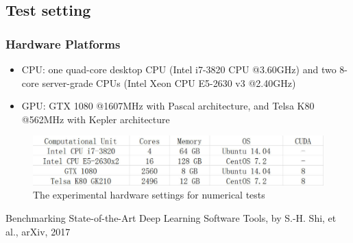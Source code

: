 \begin{frame}
\end{frame}

\subsection{Test setting}

\begin{frame}
	\MyLogo
	\frametitle{Hardware Platforms}  

\smallskip 

\begin{itemize}\setlength\itemsep{0.5em}

\item CPU: one quad-core desktop CPU (Intel i7-3820 CPU
		@3.60GHz) and two 8-core server-grade CPUs (Intel
		Xeon CPU E5-2630 v3 @2.40GHz)
		
\item GPU: GTX 1080 @1607MHz with
		Pascal architecture, and Telsa K80 @562MHz with Kepler
		architecture 
	\end{itemize}
	
\begin{figure}[htbp] 
	\includegraphics[width=0.925\paperwidth]{figures/platforms.pdf} 
	\caption{The experimental hardware settings for numerical tests}
\end{figure}
	
\begin{center}
{\color{red} \scriptsize
Benchmarking State-of-the-Art Deep Learning Software Tools, by S.-H. Shi, et al., arXiv, 2017}
\end{center}

\end{frame}


